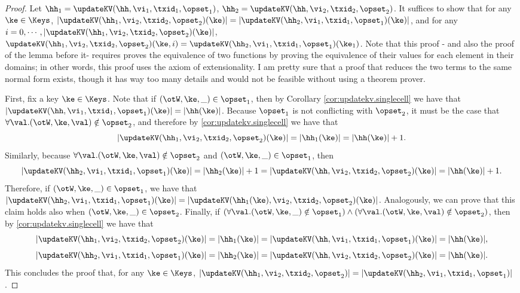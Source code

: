 \begin{proof}
Let $\hh_1 = \updateKV(\hh, \vi_1, \txid_1, \opset_1)$, $\hh_2 = \updateKV(\hh, \vi_2, \txid_2, \opset_2)$. It 
suffices to show that for any $\ke \in \Keys$, $\lvert \updateKV(\hh_1, \vi_2, \txid_2, \opset_2)(\ke) \rvert = \lvert 
\updateKV(\hh_2, \vi_1, \txid_1, \opset_1)(\ke) \rvert$, and for any $i=0,\cdots, \lvert \updateKV(\hh_1, \vi_2, \txid_2, \opset_2)(\ke) \rvert$, 
$\updateKV(\hh_1, \vi_2, \txid_2,\opset_2)(\ke, i) = \updateKV(\hh_2, \vi_1, \txid_1, \opset_1)(\ke_1)$. 
\ac{Note that this proof - and also the proof of the lemma before it- requires proves the equivalence of two functions by proving the equivalence of their values 
for each element in their domains; in other words, this proof uses the axiom of extensionality. I am pretty sure 
that a proof that reduces the two terms to the same normal form exists, though it has way too many details 
and would not be feasible without using a theorem prover.}

First, fix a key $\ke \in \Keys$. Note that if $(\otW, \ke, \_) \in \opset_1$, then 
by Corollary \ref{cor:updatekv.singlecell} we have that $\lvert \updateKV(\hh, \vi_1, \txid_1, \opset_1)(\ke) \rvert = 
\lvert \hh(\ke) \rvert$. Because $\opset_1$ is not conflicting with $\opset_2$, it must be the case 
that $\forall \val.(\otW,\ke,\val) \notin \opset_2$, and therefore by \cref{cor:updatekv.singlecell} 
we have that 
\[
\lvert \updateKV(\hh_1, \vi_2, \txid_2, \opset_2)(\ke) \rvert = \lvert \hh_1(\ke) \rvert = \lvert \hh(\ke) \rvert + 1.
\] 
Similarly, because $\forall \val.(\otW,\ke,\val)\notin \opset_2$ 
and $(\otW,\ke,\_) \in \opset_1$, then 
\[
\lvert \updateKV(\hh_2, \vi_1, \txid_1, \opset_1)(\ke) \rvert = \lvert \hh_2(\ke) \rvert + 1 = 
\lvert \updateKV(\hh, \vi_2, \txid_2, \opset_2)(\ke) \rvert = \lvert \hh(\ke) \rvert + 1.
\]
Therefore, if $(\otW, \ke, \_) \in \opset_1$, we have that 
$\lvert \updateKV(\hh_2, \vi_1, \txid_1, \opset_1)(\ke) \rvert = 
\lvert \updateKV(\hh_1(\ke), \vi_2, \txid_2, \opset_2)(\ke) \rvert$.
Analogously, we can prove that this claim holds also when $(\otW, \ke, \_) \in \opset_2$. 
Finally, if $(\forall \val.(\otW,\ke,\_) \notin \opset_1) \wedge (\forall \val.(\otW,\ke,\val) \notin \opset_2)$, 
then by \cref{cor:updatekv.singlecell} we have that 
\[
\lvert \updateKV(\hh_1, \vi_2, \txid_2, \opset_2)(\ke) \rvert = 
\lvert \hh_1(\ke) \rvert = \lvert \updateKV(\hh, \vi_1, \txid_1, \opset_1)(\ke) \rvert = \lvert \hh(\ke) \rvert,
\]
\[
\lvert \updateKV(\hh_2, \vi_1, \txid_1, \opset_1)(\ke) \rvert = 
\lvert \hh_2(\ke) \rvert = \lvert \updateKV(\hh, \vi_2, \txid_2, \opset_2)(\ke) \rvert = \lvert \hh(\ke) \rvert.
\]
This concludes the proof that, for any $\ke \in \Keys$, $\lvert \updateKV(\hh_1,\vi_2,\txid_2,\opset_2) \rvert = 
\lvert \updateKV(\hh_2,\vi_1,\txid_1,\opset_1) \rvert$.


\end{proof}
